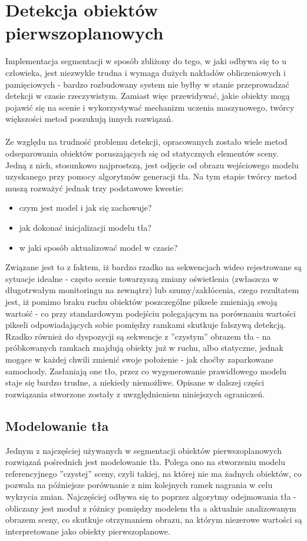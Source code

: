 \section{Detekcja obiektów pierwszoplanowych}
Implementacja segmentacji w sposób zbliżony do tego, w jaki odbywa się to u człowieka, jest niezwykle trudna i wymaga dużych nakładów obliczeniowych i pamięciowych - bardzo rozbudowany system nie byłby w stanie przeprowadzać detekcji w czasie rzeczywistym. Zamiast więc przewidywać, jakie obiekty mogą pojawić się na scenie i wykorzystywać mechanizm uczenia maszynowego, twórcy większości metod poszukują innych rozwiązań.
\paragraph{}
Ze względu na trudność problemu detekcji, opracowanych zostało wiele metod odseparowania obiektów poruszających się od statycznych elementów sceny. Jedną z nich, stosunkowo najprostszą, jest odjęcie od obrazu wejściowego modelu uzyskanego przy pomocy algorytmów generacji tła. Na tym etapie twórcy metod muszą rozważyć jednak trzy podstawowe kwestie:
\begin{itemize}
\item czym jest model i jak się zachowuje?
\item jak dokonać inicjalizacji modelu tła?
\item w jaki sposób aktualizować model w czasie?
\end{itemize}
Związane jest to z faktem, iż bardzo rzadko na sekwencjach wideo rejestrowane są sytuacje idealne - często scenie towarzyszą zmiany oświetlenia (zwłaszcza w długotrwałym monitoringu na zewnątrz) lub szumy/zakłócenia, czego rezultatem jest, iż pomimo braku ruchu obiektów poszczególne piksele zmieniają swoją wartość - co przy standardowym podejściu polegającym na porównaniu wartości pikseli odpowiadających sobie pomiędzy ramkami skutkuje fałszywą detekcją. Rzadko również do dyspozycji są sekwencje z ''czystym'' obrazem tła - na próbkowanych ramkach znajdują obiekty już w ruchu, albo statyczne, jednak mogące w każdej chwili zmienić swoje położenie - jak choćby zaparkowane samochody. Zasłaniają one tło, przez co wygenerowanie prawidłowego modelu staje się bardzo trudne, a niekiedy niemożliwe. Opisane w dalszej części rozwiązania stworzone zostały z uwzględnieniem niniejszych ograniczeń.
\subsection{Modelowanie tła}
Jednym z najczęściej używanych w segmentacji obiektów pierwszoplanowych rozwiązań pośrednich jest modelowanie tła. Polega ono na stworzeniu modelu referencyjnego ''czystej'' sceny, czyli takiej, na której nie ma żadnych obiektów, co pozwala na późniejsze porównanie z nim kolejnych ramek nagrania w celu wykrycia zmian. Najczęściej odbywa się to poprzez algorytmy odejmowania tła - obliczany jest moduł z różnicy pomiędzy modelem tła a aktualnie analizowanym obrazem sceny, co skutkuje otrzymaniem obrazu, na którym niezerowe wartości są interpretowane jako obiekty pierwszoplanowe.
